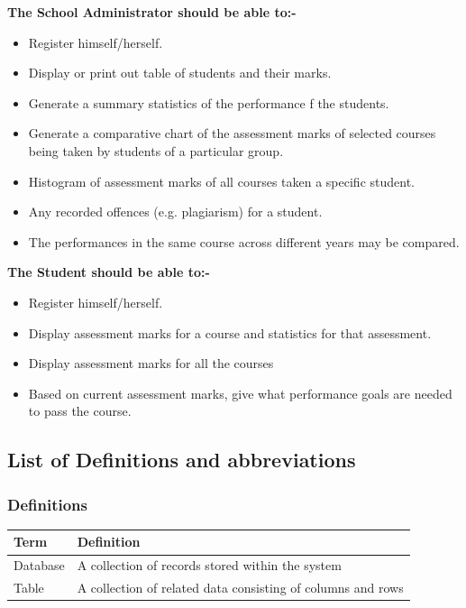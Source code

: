 \documentclass[10pt,onecolumn]{RequimentsGathering}
\begin{document}
\textbf{The School Administrator should be able to:-}
\begin{itemize}
\item Register himself/herself.
\item Display or print out table of students and their marks.
\item Generate a summary statistics of the performance f the students. 
\item Generate a comparative chart of the assessment marks of selected courses being taken by students of a particular group. 
\item Histogram of assessment marks of all courses taken a specific student.   
\item Any recorded offences (e.g. plagiarism) for a student.
\item The performances in the same course across different years may be compared.
\end{itemize}

\textbf{The Student should be able to:-}
\begin{itemize}
\item Register himself/herself.
\item Display assessment marks for a course and statistics for that assessment.
\item Display assessment marks for all the courses  
\item Based on current assessment marks, give what performance goals are needed to pass the course.
\end{itemize}

\subsection{List of Definitions and abbreviations}

\subsubsection{Definitions}
\begin{center}
    \begin{tabular}{ | p{3cm} | p{9cm} |}
\hline
\textbf{Term}& \textbf{Definition}\\ \hline
 Database & A collection of records stored within the system \\ \hline
 Table & A collection of related data consisting of columns and rows \\ \hline   
     \end{tabular}
\end{center}
\end{document}
